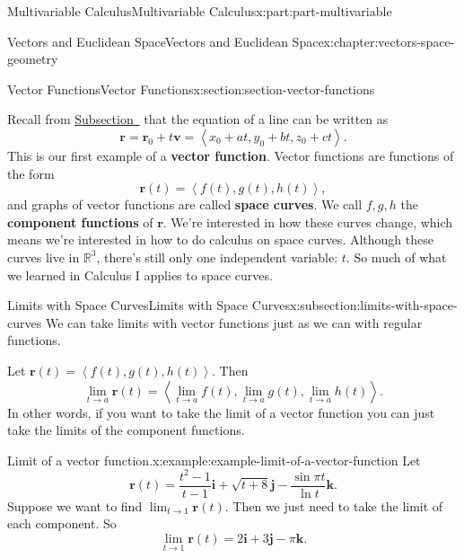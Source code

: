 \documentclass[twoside,10pt,]{tufte-book}
\newcommand{\terminology}[1]{\textbf{#1}}
\numberwithin{equation}{part}
\newcommand{\RR}{\mathbb{R}}
\newcommand{\dotprod}[1]{\left\langle #1 \right\rangle}
\begin{document}
\begin{partptx}{Multivariable Calculus}{}{Multivariable Calculus}{}{}{x:part:part-multivariable}
\begin{chapterptx}{Vectors and Euclidean Space}{}{Vectors and Euclidean Space}{}{}{x:chapter:vectors-space-geometry}
\begin{sectionptx}{Vector Functions}{}{Vector Functions}{}{}{x:section:section-vector-functions}
\begin{introduction}{}
Recall from \hyperref[x:subsection:subsection-equations-of-lines]{Subsection~} that the equation of a line can be written as%
\begin{equation*}
\mathbf{r} = \mathbf{r}_{0}+t\mathbf{v} = \dotprod{x_{0}+at, y_{0}+bt, z_{0}+ct}.
\end{equation*}
This is our first example of a \terminology{vector function}. Vector functions are functions of the form%
\begin{equation*}
\mathbf{r}(t) = \dotprod{f(t),g(t),h(t)},
\end{equation*}
and graphs of vector functions are called \terminology{space curves}. We call \(f,g,h\) the \terminology{component functions} of \(\mathbf{r}\). We're interested in how these curves change, which means we're interested in how to do calculus on space curves. Although these curves live in \(\RR^{3}\), there's still only one independent variable: \(t\). So much of what we learned in Calculus I applies to space curves.%
\end{introduction}%
%
%
\typeout{************************************************}
\typeout{************************************************}
%
\begin{subsectionptx}{Limits with Space Curves}{}{Limits with Space Curves}{}{}{x:subsection:limits-with-space-curves}
We can take limits with vector functions just as we can with regular functions.%
\par
Let \(\mathbf{r}(t) = \dotprod{f(t),g(t),h(t)}\). Then%
%
\begin{equation}
\lim_{t\to a}\mathbf{r}(t) = \dotprod{\lim_{t\to a}f(t),\lim_{t\to a}g(t),\lim_{t\to a}h(t)}.\label{x:men:limits-vector-functions}
\end{equation}
In other words, if you want to take the limit of a vector function you can just take the limits of the component functions.%
\begin{example}{Limit of a vector function.}{x:example:example-limit-of-a-vector-function}%
Let%
%
\begin{equation*}
\mathbf{r}(t) = \frac{t^{2}-1}{t-1}\mathbf{i} + \sqrt{t+8}\mathbf{j} - \frac{\sin\pi t}{\ln t}\mathbf{k}.
\end{equation*}
Suppose we want to find \(\lim_{t\to 1}\mathbf{r}(t)\). Then we just need to take the limit of each component. So%
%
\begin{equation*}
\lim_{t\to1}\mathbf{r}(t) = 2\mathbf{i}+3\mathbf{j} -\pi\mathbf{k}.
\end{equation*}

\end{example}
\end{subsectionptx}
\end{sectionptx}
\end{chapterptx}
\end{partptx}
\end{document}
